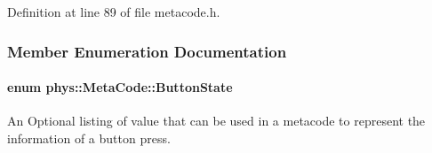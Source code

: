 Definition at line 89 of file metacode.h.



\subsubsection{Member Enumeration Documentation}
\hypertarget{classphys_1_1MetaCode_a2fdfb26b3e50ceb0ccc60bfc4c3d6ac2}{
\paragraph[{ButtonState}]{\setlength{\rightskip}{0pt plus 5cm}enum {\bf phys::MetaCode::ButtonState}}\hfill}
\label{da/dc9/classphys_1_1MetaCode_a2fdfb26b3e50ceb0ccc60bfc4c3d6ac2}


An Optional listing of value that can be used in a metacode to represent the information of a button press. 

